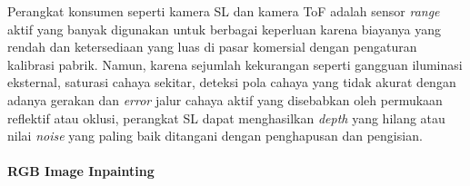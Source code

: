 Perangkat konsumen seperti kamera SL dan kamera ToF adalah sensor \textit{range} aktif yang banyak digunakan untuk berbagai keperluan karena biayanya yang rendah dan ketersediaan yang luas di pasar komersial dengan pengaturan kalibrasi pabrik.
Namun, karena sejumlah kekurangan seperti gangguan iluminasi eksternal, saturasi cahaya sekitar, deteksi pola cahaya yang tidak akurat dengan adanya gerakan dan \textit{error} jalur cahaya aktif yang disebabkan oleh permukaan reflektif atau oklusi, perangkat SL dapat menghasilkan \textit{depth} yang hilang atau nilai \textit{noise} yang paling baik ditangani dengan penghapusan dan pengisian.
%
\paragraph{RGB Image Inpainting}
\label{paragraf: rgb_inpainting}

